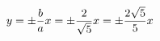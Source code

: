 \documentclass[preview]{standalone}
\begin{document}
\begin{align*}
\special{dvisvgm:raw <g id='unique000'>}y=\pm \frac{b}{a}x = \pm \frac{2}{\sqrt{5}}x = \pm \frac{2\sqrt{5}}{5}x\special{dvisvgm:raw </g>}
\end{align*}
\end{document}
